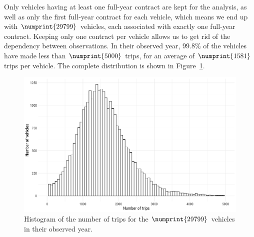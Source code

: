 \documentclass{article}
\begin{document}
Only vehicles having at least one full-year contract are kept for the analysis, as well as only the first full-year contract for each vehicle, which means we end up with $\numprint{29799}$ vehicles, each associated with exactly one full-year contract. Keeping only one contract per vehicle allows us to get rid of the dependency between observations. In their observed year, $99.8$\% of the vehicles have made less than $\numprint{5000}$ trips, for an average of $\numprint{1581}$ trips per vehicle. The complete distribution is shown in Figure~\ref{fig:hist_nb_trips}.\\
\begin{figure}[ht]
    \centering
    \includegraphics[width = \textwidth]{hist_nb_trips.png}
    \caption{Histogram of the number of trips for the $\numprint{29799}$ vehicles in their observed year.}
    \label{fig:hist_nb_trips}
\end{figure}
\end{document}
